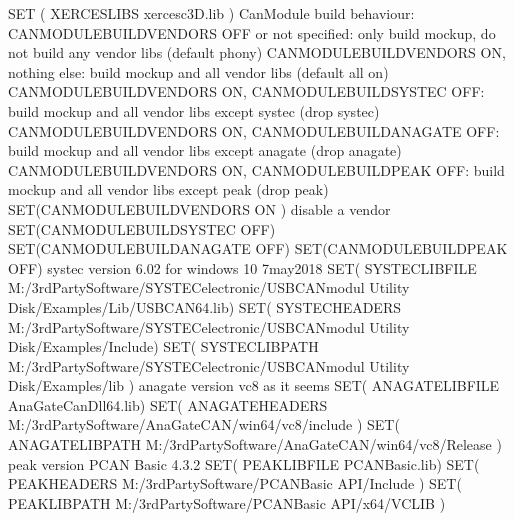 \documentclass[letterpaper,10pt,english]{sphinxmanual}
\begin{document}
\begin{sphinxVerbatim}[commandchars=\\\{\}]
SET ( XERCES\PYGZus{}LIBS \PYGZdq{}xerces\PYGZhy{}c\PYGZus{}3D.lib\PYGZdq{} )
\PYGZsh{}
\PYGZsh{} CanModule build behaviour:
\PYGZsh{} CANMODULE\PYGZus{}BUILD\PYGZus{}VENDORS OFF or not specified: only build mockup, do not build any vendor libs (default phony)
\PYGZsh{} CANMODULE\PYGZus{}BUILD\PYGZus{}VENDORS ON, nothing else: build mockup and all vendor libs (default all on)
\PYGZsh{} CANMODULE\PYGZus{}BUILD\PYGZus{}VENDORS ON, CANMODULE\PYGZus{}BUILD\PYGZus{}SYSTEC OFF: build mockup and all vendor libs except systec (drop systec)
\PYGZsh{} CANMODULE\PYGZus{}BUILD\PYGZus{}VENDORS ON, CANMODULE\PYGZus{}BUILD\PYGZus{}ANAGATE OFF: build mockup and all vendor libs except anagate (drop anagate)
\PYGZsh{} CANMODULE\PYGZus{}BUILD\PYGZus{}VENDORS ON, CANMODULE\PYGZus{}BUILD\PYGZus{}PEAK OFF: build mockup and all vendor libs except peak (drop peak)
SET(CANMODULE\PYGZus{}BUILD\PYGZus{}VENDORS \PYGZdq{}ON\PYGZdq{} )
\PYGZsh{} disable a vendor
\PYGZsh{}SET(CANMODULE\PYGZus{}BUILD\PYGZus{}SYSTEC \PYGZdq{}OFF\PYGZdq{})
\PYGZsh{}SET(CANMODULE\PYGZus{}BUILD\PYGZus{}ANAGATE \PYGZdq{}OFF\PYGZdq{})
SET(CANMODULE\PYGZus{}BUILD\PYGZus{}PEAK \PYGZdq{}OFF\PYGZdq{})
\PYGZsh{}
\PYGZsh{} systec
\PYGZsh{} version 6.02 for windows 10 7may2018
SET( SYSTEC\PYGZus{}LIB\PYGZus{}FILE \PYGZdq{}M:/3rdPartySoftware/SYSTEC\PYGZhy{}electronic/USB\PYGZhy{}CANmodul Utility Disk/Examples/Lib/USBCAN64.lib\PYGZdq{})
SET( SYSTEC\PYGZus{}HEADERS \PYGZdq{}M:/3rdPartySoftware/SYSTEC\PYGZhy{}electronic/USB\PYGZhy{}CANmodul Utility Disk/Examples/Include\PYGZdq{})
SET( SYSTEC\PYGZus{}LIB\PYGZus{}PATH \PYGZdq{}M:/3rdPartySoftware/SYSTEC\PYGZhy{}electronic/USB\PYGZhy{}CANmodul Utility Disk/Examples/lib\PYGZdq{} )
\PYGZsh{}
\PYGZsh{} anagate
\PYGZsh{} version vc8 as it seems
SET( ANAGATE\PYGZus{}LIB\PYGZus{}FILE \PYGZdq{}AnaGateCanDll64.lib\PYGZdq{})
SET( ANAGATE\PYGZus{}HEADERS \PYGZdq{}M:/3rdPartySoftware/AnaGateCAN/win64/vc8/include\PYGZdq{} )
SET( ANAGATE\PYGZus{}LIB\PYGZus{}PATH \PYGZdq{}M:/3rdPartySoftware/AnaGateCAN/win64/vc8/Release\PYGZdq{} )
\PYGZsh{}
\PYGZsh{}\PYGZsh{} peak
\PYGZsh{}\PYGZsh{} version PCAN Basic 4.3.2
\PYGZsh{}\PYGZsh{}SET( PEAK\PYGZus{}LIB\PYGZus{}FILE \PYGZdq{}PCANBasic.lib\PYGZdq{})
\PYGZsh{}\PYGZsh{}SET( PEAK\PYGZus{}HEADERS \PYGZdq{}M:/3rdPartySoftware/PCAN\PYGZhy{}Basic API/Include\PYGZdq{} )
\PYGZsh{}\PYGZsh{}SET( PEAK\PYGZus{}LIB\PYGZus{}PATH \PYGZdq{}M:/3rdPartySoftware/PCAN\PYGZhy{}Basic API/x64/VC\PYGZus{}LIB\PYGZdq{} )
\end{sphinxVerbatim}

\end{document}

